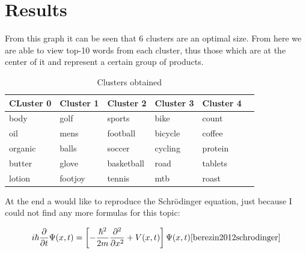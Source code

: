 \documentclass[twoside,twocolumn]{article}
\begin{document}
\section{Results}

From this graph it can be seen that 6 clusters are an optimal size. From here we are
able to view top-10 words from each cluster, thus those which are at the center of it
and represent a certain group of products. 


\begin{table}[h]
\centering
\caption{Clusters obtained}
\begin{tabular}{llllll}
\centering

CLuster 0 & Cluster 1 & Cluster 2 & Cluster 3 & Cluster 4 \\
\hline \hline 

\small body & golf & sports & bike & count   \\
\hline
\small oil & mens & football & bicycle & coffee   \\
\hline
\small organic & balls & soccer & cycling & protein   \\
\hline
\small butter & glove & basketball & road & tablets\\
\hline 
\small lotion & footjoy & tennis & mtb & roast \\
\hline
\end{tabular}
\end{table}


At the end a would like to reproduce the Schrödinger equation, just because I could not find any more formulas for this topic:

\begin{equation}
    i \hbar \frac{\partial}{\partial t} \Psi(x, t)=\left[-\frac{\hbar^{2}}{2 m} \frac{\partial^{2}}{\partial x^{2}}+V(x, t)\right] \Psi(x, t) \cite{berezin2012schrodinger}
\end{equation}


\clearpage



\end{document}
